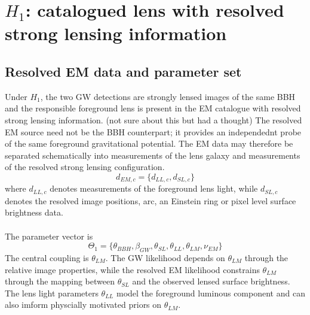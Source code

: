 \documentclass[pdflatex,sn-mathphys-num]{sn-jnl}%
\theoremstyle{thmstyleone}%
\theoremstyle{thmstyletwo}%
\theoremstyle{thmstylethree}%
\begin{document}
\section{$H_1$: catalogued lens with resolved strong lensing information}
\subsection{Resolved EM data and parameter set}
Under $H_1$, the two GW detections are strongly lensed images of the same BBH and the responsible foreground lens is present in the EM catalogue with resolved strong lensing information.
(not sure about this but had a thought) The resolved EM source need not be the BBH counterpart; it provides an independednt probe of the same foreground gravitational potential.
The EM data may therefore be separated schematically into measurements of the lens galaxy and measurements of the resolved strong lensing configuration.
\begin{equation}
d_{EM,c} = \{d_{LL,c},d_{SL,c}\}
\end{equation}
where $d_{LL,c}$ denotes measurements of the foreground lens light, while $d_{SL,c}$ denotes the resolved image positions, arc, an Einstein ring or pixel level surface brightness data.\\
\\
The parameter vector is
\begin{equation}
	\Theta_1 = \{\theta_{BBH},\beta_{GW},\theta_{SL},\theta_{LL},\theta_{LM},\nu_{EM}\}
\end{equation}
The central coupling is $\theta_{LM}$.
The GW likelihood depends on $\theta_{LM}$ through the relative image properties, while the resolved EM likelihood constrains $\theta_{LM}$ through the mapping between $\theta_{SL}$ and the observed lensed surface brightness.
The lens light parameters $\theta_{LL}$ model the foreground luminous component and can also imform physcially motivated priors on $\theta_{LM}$.
\end{document}
